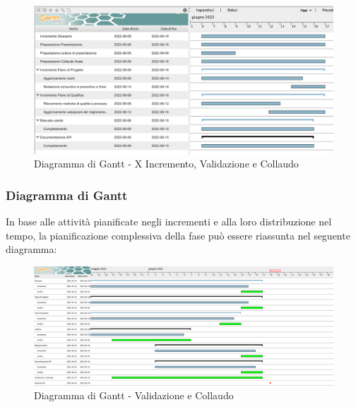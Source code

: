 \begin{figure}[H]
	\centering
	\includegraphics[scale=0.40]{Sezioni/gantt/X_incremento.png}
	\caption{Diagramma di Gantt - X Incremento, Validazione e Collaudo}
\end{figure}

\pagebreak

\subsubsection{Diagramma di Gantt}
In base alle attività pianificate negli incrementi e alla loro distribuzione nel tempo, la pianificazione complessiva della fase può essere riassunta nel seguente diagramma:
\begin{figure}[H]
    \centerfloat
    \includegraphics[scale=0.27]{Sezioni/gantt/validazione_collaudo.png}
	\caption{Diagramma di Gantt - Validazione e Collaudo}
\end{figure}








